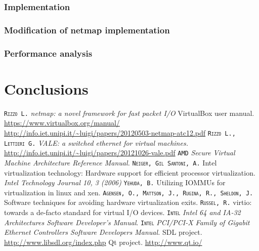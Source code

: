 \documentclass[a4paper, 12pt, titlepage]{report}
\newcommand{\autori}[1]{\textsc{\texttt{#1}}}
\begin{document}
\subsection{Implementation}
\subsection{Modification of netmap implementation}
\subsection{Performance analysis}
\chapter{Conclusions}

\begin{thebibliography}{30}
 \autori{Rizzo L.} \textit{netmap: a novel framework for fast packet I/O}
 VirtualBox user manual. \url{https://www.virtualbox.org/manual/}
 \url{http://info.iet.unipi.it/~luigi/papers/20120503-netmap-atc12.pdf}
 \autori{Rizzo L., Lettieri G.} \textit{VALE: a switched ethernet for virtual machines.} \url{http://info.iet.unipi.it/~luigi/papers/20121026-vale.pdf}
 \autori{AMD} \textit{Secure Virtual Machine Architecture Reference Manual.}
 \autori{Neiger, Gil Santoni, A.} Intel virtualization technology: Hardware support for efficient processor virtualization. \textit{Intel Technology Journal 10, 3 (2006)}
 \autori{Yehuda, B.} Utilizing IOMMUs for virtualization in linux and xen.
 \autori{Agensen, O., Mattson, J., Rugina, R., Sheldon, J.} Software techniques for avoiding hardware virtualization exits.
 \autori{Russel, R.} virtio: towards a de-facto standard for virtual I/O devices.
 \autori{Intel} \textit{Intel 64 and IA-32 Architectures Software Developer's Manual}.
 \autori{Intel} \textit{PCI/PCI-X Family of Gigabit Ethernet Controllers Software Developers Manual.}
 SDL project. \url{http://www.libsdl.org/index.php}
 Qt project. \url{http://www.qt.io/}
\end{thebibliography}
	
\end{document}
